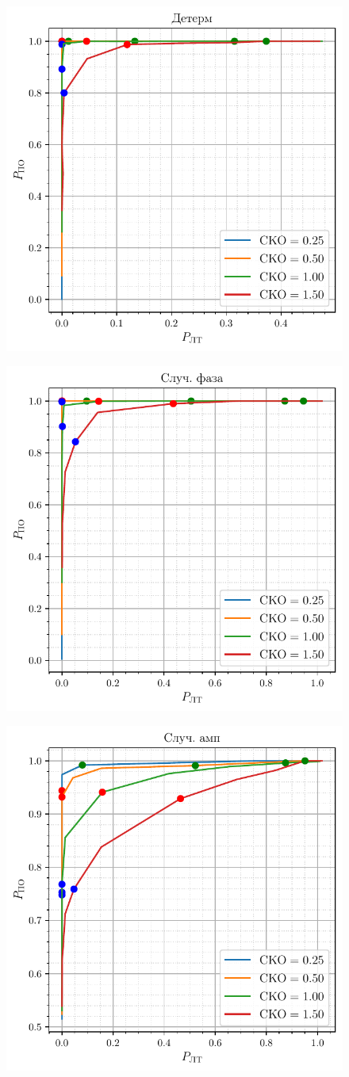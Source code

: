 \begin{figure}[H]
	\centering
	\includegraphics[width =0.5\linewidth]{data/data_determ.pdf}
	\caption{}
	\label{fig:1}
\end{figure}
\begin{figure}[H]
	\centering
	\includegraphics[width =0.5\linewidth]{data/data_phase.pdf}
	\caption{}
	\label{fig:1}
\end{figure}
\begin{figure}[H]
	\centering
	\includegraphics[width =0.5\linewidth]{data/data_amplitude.pdf}
	\caption{}
	\label{fig:1}
\end{figure}
